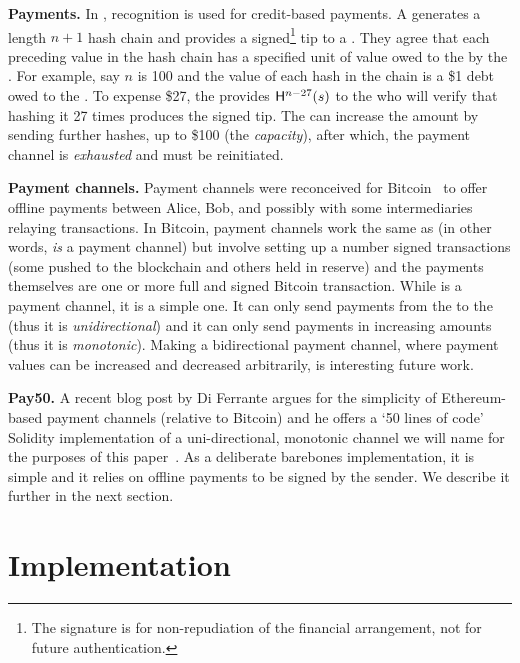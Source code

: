 \textbf{Payments.} In \pw, recognition is used for credit-based payments. A \make generates a length $n+1$ hash chain and provides a signed\footnote{The signature is for non-repudiation of the financial arrangement, not for future authentication.} tip to a \take. They agree that each preceding value in the hash chain has a specified unit of value owed to the \take by the \make. For example, say $n$ is 100 and the value of each hash in the chain is a \$1 debt owed to the \take. To expense \$27, the \make provides $\mathsf{H}^{n-27}(s)$ to the \take who will verify that hashing it 27 times produces the signed tip. The \make can increase the amount by sending further hashes, up to \$100 (the \textit{capacity}), after which, the payment channel is \textit{exhausted} and must be reinitiated.

\textbf{Payment channels.} Payment channels were reconceived for Bitcoin~\cite{DW15,PD15} to offer offline payments between Alice, Bob, and possibly with some intermediaries relaying transactions. In Bitcoin, payment channels work the same as \ew (in other words, \ew \textit{is} a payment channel) but involve setting up a number signed transactions (some pushed to the blockchain and others held in reserve) and the payments themselves are one or more full and signed Bitcoin transaction. While \ew is a payment channel, it is a simple one. It can only send payments from the \make to the \take (thus it is \textit{unidirectional}) and it can only send payments in increasing amounts (thus it is \textit{monotonic}). Making a bidirectional payment channel, where payment values can be increased and decreased arbitrarily, is interesting future work.

\label{sec:pcn}

\textbf{Pay50.} A recent blog post by Di Ferrante argues for the simplicity of Ether\-eum-based payment channels (relative to Bitcoin) and he offers a `50 lines of code' Solidity implementation of a uni-directional, monotonic channel we will name \fifty for the purposes of this paper~\cite{DF17}. As a deliberate barebones implementation, it is simple and it relies on offline payments to be signed by the sender. We describe it further in the next section. 


\section{\ew Implementation}

